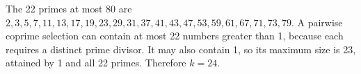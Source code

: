 The 22 primes at most 80 are $2,3,5,7,11,13,17,19,23,29,31,37,41,43,47,53,59,61,67,71,73,79$. A pairwise coprime selection can contain at most 22 numbers greater than 1, because each requires a distinct prime divisor. It may also contain 1, so its maximum size is 23, attained by 1 and all 22 primes. Therefore $\boxed{k=24}$.

